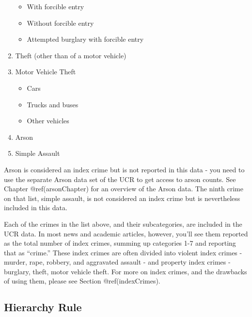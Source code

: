 \documentclass[
  12pt,
  openany]{book}
\providecommand{\tightlist}{%
  \setlength{\itemsep}{0pt}\setlength{\parskip}{0pt}}
\begin{document}
\begin{enumerate}
  \begin{itemize}
  \tightlist
  \item
    With forcible entry\\
  \item
    Without forcible entry\\
  \item
    Attempted burglary with forcible entry\\
  \end{itemize}
\item
  Theft (other than of a motor vehicle)\\
\item
  Motor Vehicle Theft

  \begin{itemize}
  \tightlist
  \item
    Cars\\
  \item
    Trucks and buses\\
  \item
    Other vehicles\\
  \end{itemize}
\item
  Arson\\
\item
  Simple Assault
\end{enumerate}

Arson is considered an index crime but is not reported in this data - you need to use the separate Arson data set of the UCR to get access to arson counts. See Chapter @ref(arsonChapter) for an overview of the Arson data. The ninth crime on that list, simple assault, is not considered an index crime but is nevertheless included in this data.

Each of the crimes in the list above, and their subcategories, are included in the UCR data. In most news and academic articles, however, you'll see them reported as the total number of index crimes, summing up categories 1-7 and reporting that as ``crime.'' These index crimes are often divided into violent index crimes - murder, rape, robbery, and aggravated assault - and property index crimes - burglary, theft, motor vehicle theft. For more on index crimes, and the drawbacks of using them, please see Section @ref(indexCrimes).

\hypertarget{hierarchy}{%
\subsection{Hierarchy Rule}\label{hierarchy}}
\end{document}
